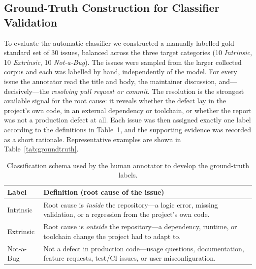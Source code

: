 
\subsection{Ground-Truth Construction for Classifier Validation}
\label{sec:ground-truth}

To evaluate the automatic classifier we constructed a manually labelled
gold-standard set of 30 issues, balanced across the three target categories
(10 \emph{Intrinsic}, 10 \emph{Extrinsic}, 10 \emph{Not-a-Bug}). The issues were
sampled from the larger collected corpus and each was labelled by hand,
independently of the model. For every issue the annotator read the title and
body, the maintainer discussion, and---decisively---the \emph{resolving pull
request or commit}. The resolution is the strongest available signal for the
root cause: it reveals whether the defect lay in the project's own code, in an
external dependency or toolchain, or whether the report was not a production
defect at all. Each issue was then assigned exactly one label according to the
definitions in Table~\ref{tab:labels}, and the supporting evidence was recorded
as a short rationale. Representative examples are shown in
Table~\ref{tab:groundtruth}.

\begin{table}[t]
  \centering
  \caption{Classification schema used by the human annotator to develop the
           ground-truth labels.}
  \label{tab:labels}
  \begin{tabularx}{\linewidth}{@{}lX@{}}
    \toprule
    \textbf{Label} & \textbf{Definition (root cause of the issue)} \\
    \midrule
    Intrinsic  & Root cause is \emph{inside} the repository---a logic error,
                 missing validation, or a regression from the project's own code. \\
    Extrinsic  & Root cause is \emph{outside} the repository---a dependency,
                 runtime, or toolchain change the project had to adapt to. \\
    Not-a-Bug  & Not a defect in production code---usage questions,
                 documentation, feature requests, test/CI issues, or user
                 misconfiguration. \\
    \bottomrule
  \end{tabularx}
\end{table}


